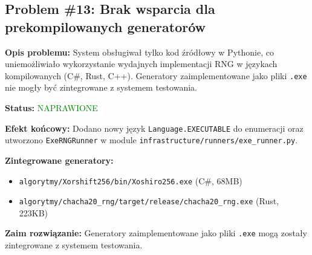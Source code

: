 \documentclass[12pt,a4paper]{article}
\begin{document}
                                                                                                                   
  \subsection{Problem \#13: Brak wsparcia dla prekompilowanych generatorów}                                        
                                                                                                                   
  \begin{tcolorbox}[colback=violet!5!white,colframe=violet!75!black,title=Rozszerzenie Backendu - Priorytet:       
  WYSOKI]                                                                                                          
  \textbf{Opis problemu:}                                                                                          
  System obsługiwał tylko kod źródłowy w Pythonie, co uniemożliwiało wykorzystanie wydajnych implementacji RNG w   
  językach kompilowanych (C\#, Rust, C++). Generatory zaimplementowane jako pliki \texttt{.exe} nie mogły być zintegrowane z systemem testowania.                                                                             
               
  \textbf{Status:} \textcolor{green}{NAPRAWIONE}                                                                   
                                                                                                                   
  \textbf{Efekt końcowy:}                                                                             
  Dodano nowy język \texttt{Language.EXECUTABLE} do enumeracji oraz utworzono \texttt{ExeRNGRunner} w module       
  \texttt{infrastructure/runners/exe\_runner.py}.                                                                                                                                                       
                                                                                                                          
  \textbf{Zintegrowane generatory:}                                                                                
  \begin{itemize}[itemsep=0pt]                                                                                     
      \item \texttt{algorytmy/Xorshift256/bin/Xoshiro256.exe} (C\#, 68MB)                                          
      \item \texttt{algorytmy/chacha20\_rng/target/release/chacha20\_rng.exe} (Rust, 223KB)                        
  \end{itemize}    
    \textbf{Zaim rozwiązanie:}
    Generatory zaimplementowane jako pliki \texttt{.exe} mogą zostały zintegrowane z systemem testowania.                                                                             

  
  \end{tcolorbox}                                                                                                                                                                                                        
\end{document}

